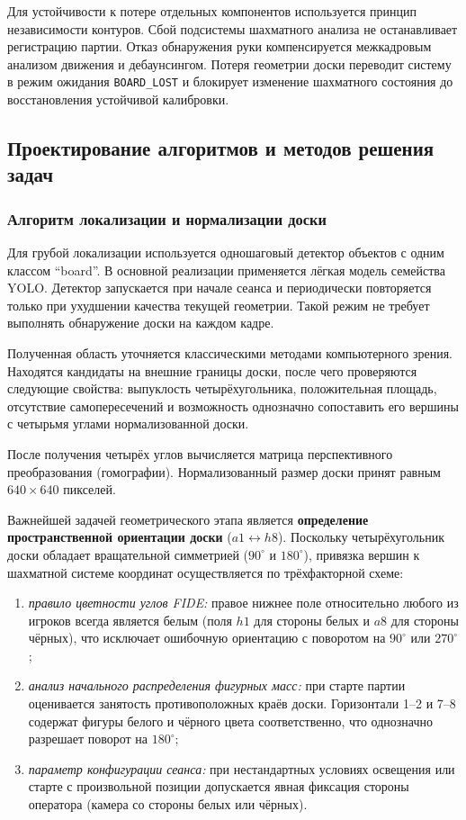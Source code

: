 Для устойчивости к потере отдельных компонентов используется принцип независимости контуров. Сбой подсистемы шахматного анализа не останавливает регистрацию партии. Отказ обнаружения руки компенсируется межкадровым анализом движения и дебаунсингом. Потеря геометрии доски переводит систему в режим ожидания \texttt{BOARD\_LOST} и блокирует изменение шахматного состояния до восстановления устойчивой калибровки.

\subsection{Проектирование алгоритмов и методов решения задач}

\subsubsection{Алгоритм локализации и нормализации доски}

Для грубой локализации используется одношаговый детектор объектов с одним классом ``board''. В основной реализации применяется лёгкая модель семейства YOLO. Детектор запускается при начале сеанса и периодически повторяется только при ухудшении качества текущей геометрии. Такой режим не требует выполнять обнаружение доски на каждом кадре.

Полученная область уточняется классическими методами компьютерного зрения. Находятся кандидаты на внешние границы доски, после чего проверяются следующие свойства: выпуклость четырёхугольника, положительная площадь, отсутствие самопересечений и возможность однозначно сопоставить его вершины с четырьмя углами нормализованной доски.

После получения четырёх углов вычисляется матрица перспективного преобразования (гомографии). Нормализованный размер доски принят равным $640\times640$ пикселей. 

Важнейшей задачей геометрического этапа является \textbf{определение пространственной ориентации доски} ($a1 \leftrightarrow h8$). Поскольку четырёхугольник доски обладает вращательной симметрией ($90^\circ$ и $180^\circ$), привязка вершин к шахматной системе координат осуществляется по трёхфакторной схеме:
\begin{enumerate}
    \item \textit{правило цветности углов FIDE:} правое нижнее поле относительно любого из игроков всегда является белым (поля $h1$ для стороны белых и $a8$ для стороны чёрных), что исключает ошибочную ориентацию с поворотом на $90^\circ$ или $270^\circ$;
    \item \textit{анализ начального распределения фигурных масс:} при старте партии оценивается занятость противоположных краёв доски. Горизонтали 1--2 и 7--8 содержат фигуры белого и чёрного цвета соответственно, что однозначно разрешает поворот на $180^\circ$;
    \item \textit{параметр конфигурации сеанса:} при нестандартных условиях освещения или старте с произвольной позиции допускается явная фиксация стороны оператора (камера со стороны белых или чёрных).
\end{enumerate}

